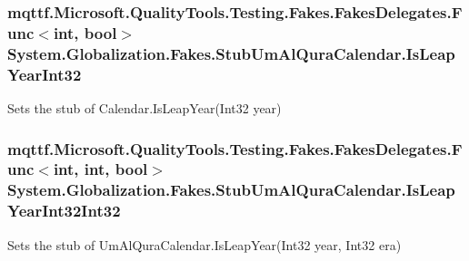 \hypertarget{class_system_1_1_globalization_1_1_fakes_1_1_stub_um_al_qura_calendar_a005a692fbb7a400cc492e4eea4852998}{
\subsubsection[{Is\-Leap\-Year\-Int32}]{\setlength{\rightskip}{0pt plus 5cm}mqttf.\-Microsoft.\-Quality\-Tools.\-Testing.\-Fakes.\-Fakes\-Delegates.\-Func$<$int, bool$>$ System.\-Globalization.\-Fakes.\-Stub\-Um\-Al\-Qura\-Calendar.\-Is\-Leap\-Year\-Int32}}\label{class_system_1_1_globalization_1_1_fakes_1_1_stub_um_al_qura_calendar_a005a692fbb7a400cc492e4eea4852998}


Sets the stub of Calendar.\-Is\-Leap\-Year(\-Int32 year)

\hypertarget{class_system_1_1_globalization_1_1_fakes_1_1_stub_um_al_qura_calendar_af6af8f1fdbb6de585508e9db5b37e4ef}{
\subsubsection[{Is\-Leap\-Year\-Int32\-Int32}]{\setlength{\rightskip}{0pt plus 5cm}mqttf.\-Microsoft.\-Quality\-Tools.\-Testing.\-Fakes.\-Fakes\-Delegates.\-Func$<$int, int, bool$>$ System.\-Globalization.\-Fakes.\-Stub\-Um\-Al\-Qura\-Calendar.\-Is\-Leap\-Year\-Int32\-Int32}}\label{class_system_1_1_globalization_1_1_fakes_1_1_stub_um_al_qura_calendar_af6af8f1fdbb6de585508e9db5b37e4ef}


Sets the stub of Um\-Al\-Qura\-Calendar.\-Is\-Leap\-Year(\-Int32 year, Int32 era)

